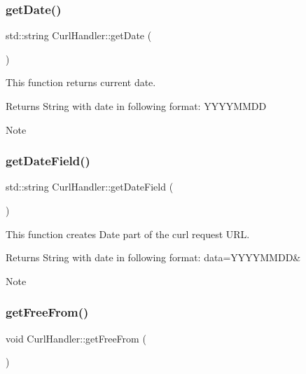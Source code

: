 \subsubsection{\texorpdfstring{get\+Date()}{getDate()}}
{\footnotesize\ttfamily std\+::string Curl\+Handler\+::get\+Date (\begin{DoxyParamCaption}{ }\end{DoxyParamCaption})}



This function returns current date. 

\begin{DoxyReturn}{Returns}
String with date in following format\+: Y\+Y\+Y\+Y\+M\+M\+DD 
\end{DoxyReturn}
\begin{DoxyNote}{Note}

\end{DoxyNote}
\mbox{\label{classCurlHandler_a021967e447f8980a4629b85cc3683a93}} 
\subsubsection{\texorpdfstring{get\+Date\+Field()}{getDateField()}}
{\footnotesize\ttfamily std\+::string Curl\+Handler\+::get\+Date\+Field (\begin{DoxyParamCaption}{ }\end{DoxyParamCaption})}



This function creates Date part of the curl request U\+RL. 

\begin{DoxyReturn}{Returns}
String with date in following format\+: data=Y\+Y\+Y\+Y\+M\+M\+DD\& 
\end{DoxyReturn}
\begin{DoxyNote}{Note}

\end{DoxyNote}
\mbox{\label{classCurlHandler_a43b8d7b4ec2866c34820baa71236a15a}} 
\subsubsection{\texorpdfstring{get\+Free\+From()}{getFreeFrom()}}
{\footnotesize\ttfamily void Curl\+Handler\+::get\+Free\+From (\begin{DoxyParamCaption}{ }\end{DoxyParamCaption})}



